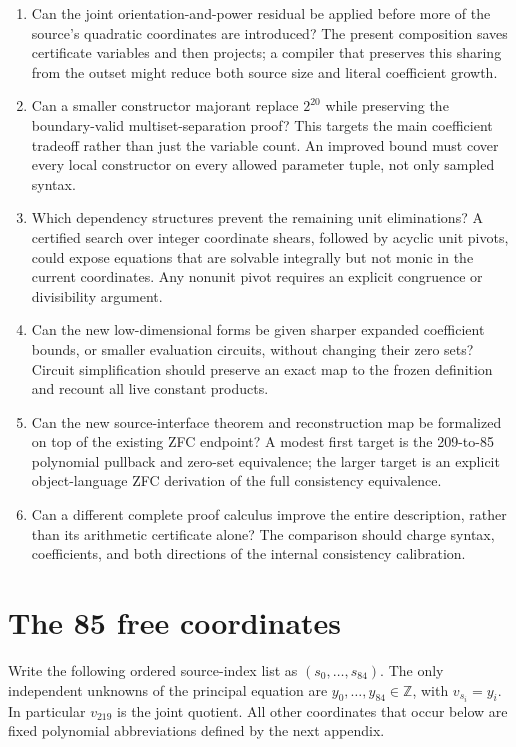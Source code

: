 \documentclass[11pt]{article}
\theoremstyle{definition}\newtheorem{definition}[theorem]{Definition}
\theoremstyle{remark}\newtheorem{remark}[theorem]{Remark}
\newcommand{\Z}{\mathbb Z}\newcommand{\N}{\mathbb N}
\begin{document}
\begin{enumerate}
\item Can the joint orientation-and-power residual be applied before
more of the source's quadratic coordinates are introduced? The
present composition saves certificate variables and then projects;
a compiler that preserves this sharing from the outset might reduce
both source size and literal coefficient growth.
\item Can a smaller constructor majorant replace $2^{20}$ while
preserving the boundary-valid multiset-separation proof? This targets
the main coefficient tradeoff rather than just the variable count.
An improved bound must cover every local constructor on every
allowed parameter tuple, not only sampled syntax.
\item Which dependency structures prevent the remaining unit
eliminations? A certified search over integer coordinate shears,
followed by acyclic unit pivots, could expose equations that are
solvable integrally but not monic in the current coordinates.
Any nonunit pivot requires an explicit congruence or divisibility
argument.
\item Can the new low-dimensional forms be given sharper expanded
coefficient bounds, or smaller evaluation circuits, without changing
their zero sets? Circuit simplification should preserve an exact
map to the frozen definition and recount all live constant products.
\item Can the new source-interface theorem and reconstruction map
be formalized on top of the existing ZFC endpoint? A modest first
target is the 209-to-85 polynomial pullback and zero-set equivalence;
the larger target is an explicit object-language ZFC derivation of
the full consistency equivalence.
\item Can a different complete proof calculus improve the entire
description, rather than its arithmetic certificate alone? The
comparison should charge syntax, coefficients, and both directions
of the internal consistency calibration.
\end{enumerate}

\appendix
\clearpage
\section{The 85 free coordinates}
\label{app:free}
Write the following ordered source-index list as
$(s_0,\ldots,s_{84})$. The only independent unknowns of the principal
equation are $y_0,\ldots,y_{84}\in\Z$, with $v_{s_i}=y_i$.
In particular $v_{219}$ is the joint quotient. All other coordinates
that occur below are fixed polynomial abbreviations defined by the
next appendix.

\end{document}
